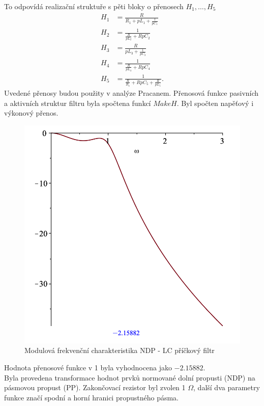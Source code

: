 \noindent To odpovídá realizační struktuře s pěti bloky o přenosech $H_1, \ldots,H_5$
\begin{align}
H_1 & = \frac{R}{R_1 + pL_1 + \frac{1}{pC_1}}\\
H_2 &= \frac{1}{\frac{R}{pL_2} + RpC_2}\\
H_3 &= \frac{R}{pL_3 + \frac{1}{pC_3}}\\
H_4 &= \frac{1}{\frac{R}{pL_4}+RpC_4}\\
H_5 &= \frac{1}{\frac{R}{R_z}+RpC_5 + \frac{R}{pL_5}}.
\end{align}
\noindent Uvedené přenosy budou použity v analýze Pracanem.
\noindent Přenosová funkce pasivních a aktivních struktur filtru byla spočtena funkcí $MakeH$. Byl spočten  napěťový i výkonový přenos.
\begin{figure}[h]
\centering
\includegraphics[scale=0.5]{sch022.png}
\caption{Modulová frekvenční charakteristika NDP - LC příčkový filtr}
\end{figure}
\noindent Hodnota přenosové funkce v 1 byla vyhodnocena jako $-2.15882$.\\
Byla provedena transformace hodnot prvků normované dolní propusti (NDP) na pásmovou propust (PP). Zakončovací rezistor byl zvolen 1 $\Omega$, další dva parametry funkce značí spodní a horní hranici propustného pásma.

